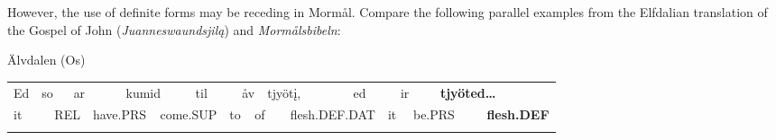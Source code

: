 \begin{styleBodytextC}
However, the use of definite forms may be receding in Mormål. Compare the following parallel examples from the Elfdalian translation of the Gospel of John (\textit{Juanneswaundsjilą}) and \textit{Mormålsbibeln}:

\end{styleBodytextC}

\begin{listWWNumileveli}
\item 

\end{listWWNumileveli}

\begin{listWWNumxxviileveli}
\item 

\begin{styleExLtrTbl}
Älvdalen (Os)

\end{styleExLtrTbl}

\end{listWWNumxxviileveli}

\begin{tabular}{llllllllllllllllllll}
\lsptoprule
Ed & \multicolumn{2}{l}{so

} & \multicolumn{2}{l}{ar

} & \multicolumn{2}{l}{kumid

} & \multicolumn{2}{l}{til

} & \multicolumn{2}{l}{åv

} & \multicolumn{2}{l}{tjyöt\k{i},

} & \multicolumn{2}{l}{ed

} & \multicolumn{2}{l}{ir

} & \multicolumn{2}{l}{{\bfseries tjyöted…}

} & \\
\multicolumn{2}{l}{it

} & \multicolumn{2}{l}{REL

} & \multicolumn{2}{l}{have.PRS

} & \multicolumn{2}{l}{come.SUP

} & \multicolumn{2}{l}{to

} & \multicolumn{2}{l}{of

} & \multicolumn{2}{l}{flesh.DEF.DAT

} & \multicolumn{2}{l}{it

} & \multicolumn{2}{l}{be.PRS

} & \multicolumn{2}{l}{{\bfseries flesh.DEF}

}\\
\lspbottomrule
\end{tabular}


